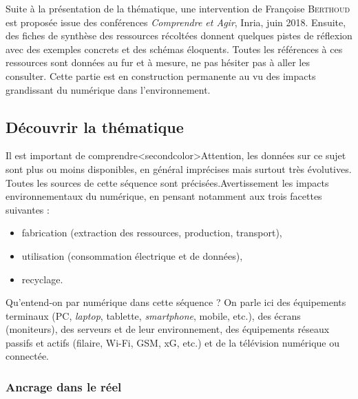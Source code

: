 Suite à la présentation de la thématique, une intervention de Françoise \textsc{Berthoud} est proposée issue des conférences \textit{Comprendre et Agir}, Inria, juin 2018. Ensuite, des fiches de synthèse des ressources récoltées donnent quelques pistes de réflexion avec des exemples con\-crets et des schémas éloquents. Toutes les références à ces ressources sont données au fur et à mesure, ne pas hésiter pas à aller les consulter. Cette partie est en construction permanente au vu des impacts grandissant du numérique dans l'environnement.



\subsection[Découvrir la thématique]{Découvrir la thématique}
\label{sub:IX.4.1}

Il est important de comprendre\caution[t]<secondcolor>{Attention, les données sur ce sujet sont plus ou moins disponibles, en général imprécises mais surtout très évolutives. Toutes les sources de cette séquence sont précisées.}{Avertissement}
 les impacts environnementaux du numérique, en pensant notamment aux trois facettes suivantes :
\begin{itemize}
\item fabrication (extraction des ressources, production, transport),
\item utilisation (consommation électrique et de données),
\item recyclage.
\end{itemize}

Qu'entend-on par numérique dans cette séquence ? On parle ici des équipements terminaux (PC, \textit{laptop}, tablette, \textit{smartphone}, mobile, etc.), des écrans (moniteurs), des serveurs et de leur environnement, des équipements réseaux passifs et actifs (filaire, Wi-Fi, GSM, xG, etc.) et de la télévision numérique ou connectée.

\subsubsection[Ancrage dans le réel]{Ancrage dans le réel}
\label{subsub:IX.4.1.1}


